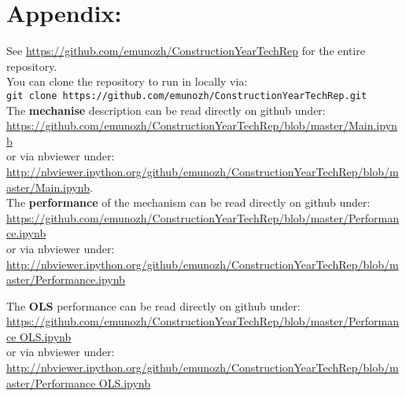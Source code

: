 \section{Appendix:}

See \url{https://github.com/emunozh/ConstructionYearTechRep} for the entire
repository.\\ 

You can clone the repository to run in locally via:\\
\verb|git clone https://github.com/emunozh/ConstructionYearTechRep.git|\\

The \textbf{mechanise} description can be read directly on github under:\\
\url{https://github.com/emunozh/ConstructionYearTechRep/blob/master/Main.ipynb}
\\
or via nbviewer under:\\
\url{http://nbviewer.ipython.org/github/emunozh/ConstructionYearTechRep/blob/master/Main.ipynb}.\\

The \textbf{performance} of the mechanism can be read directly on github
under:\\
\url{https://github.com/emunozh/ConstructionYearTechRep/blob/master/Performance.ipynb}
\\
or via nbviewer under:\\
\url{http://nbviewer.ipython.org/github/emunozh/ConstructionYearTechRep/blob/master/Performance.ipynb}


The \textbf{OLS} performance can be read directly on github
under:\\
\url{https://github.com/emunozh/ConstructionYearTechRep/blob/master/Performance OLS.ipynb}
\\
or via nbviewer under:\\
\url{http://nbviewer.ipython.org/github/emunozh/ConstructionYearTechRep/blob/master/Performance OLS.ipynb}


